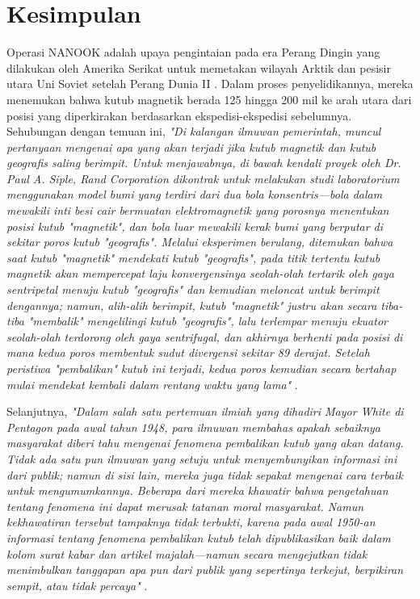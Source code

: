 \documentclass[10pt,twocolumn,letterpaper]{article}
\begin{document}
\section{Kesimpulan}

Operasi NANOOK adalah upaya pengintaian pada era Perang Dingin yang dilakukan oleh Amerika Serikat untuk memetakan wilayah Arktik dan pesisir utara Uni Soviet setelah Perang Dunia II \cite{137}. Dalam proses penyelidikannya, mereka menemukan bahwa kutub magnetik berada 125 hingga 200 mil ke arah utara dari posisi yang diperkirakan berdasarkan ekspedisi-ekspedisi sebelumnya. Sehubungan dengan temuan ini, \textit{"Di kalangan ilmuwan pemerintah, muncul pertanyaan mengenai apa yang akan terjadi jika kutub magnetik dan kutub geografis saling berimpit. Untuk menjawabnya, di bawah kendali proyek oleh Dr. Paul A. Siple, Rand Corporation dikontrak untuk melakukan studi laboratorium menggunakan model bumi yang terdiri dari dua bola konsentris—bola dalam mewakili inti besi cair bermuatan elektromagnetik yang porosnya menentukan posisi kutub "magnetik", dan bola luar mewakili kerak bumi yang berputar di sekitar poros kutub "geografis". Melalui eksperimen berulang, ditemukan bahwa saat kutub "magnetik" mendekati kutub "geografis", pada titik tertentu kutub magnetik akan mempercepat laju konvergensinya seolah-olah tertarik oleh gaya sentripetal menuju kutub "geografis" dan kemudian meloncat untuk berimpit dengannya; namun, alih-alih berimpit, kutub "magnetik" justru akan secara tiba-tiba "membalik" mengelilingi kutub "geografis", lalu terlempar menuju ekuator seolah-olah terdorong oleh gaya sentrifugal, dan akhirnya berhenti pada posisi di mana kedua poros membentuk sudut divergensi sekitar 89 derajat. Setelah peristiwa "pembalikan" kutub ini terjadi, kedua poros kemudian secara bertahap mulai mendekat kembali dalam rentang waktu yang lama"} \cite{138,139}.

Selanjutnya, \textit{"Dalam salah satu pertemuan ilmiah yang dihadiri Mayor White di Pentagon pada awal tahun 1948, para ilmuwan membahas apakah sebaiknya masyarakat diberi tahu mengenai fenomena pembalikan kutub yang akan datang. Tidak ada satu pun ilmuwan yang setuju untuk menyembunyikan informasi ini dari publik; namun di sisi lain, mereka juga tidak sepakat mengenai cara terbaik untuk mengumumkannya. Beberapa dari mereka khawatir bahwa pengetahuan tentang fenomena ini dapat merusak tatanan moral masyarakat. Namun kekhawatiran tersebut tampaknya tidak terbukti, karena pada awal 1950-an informasi tentang fenomena pembalikan kutub telah dipublikasikan baik dalam kolom surat kabar dan artikel majalah—namun secara mengejutkan tidak menimbulkan tanggapan apa pun dari publik yang sepertinya terkejut, berpikiran sempit, atau tidak percaya"} \cite{138,139}.
\end{document}
